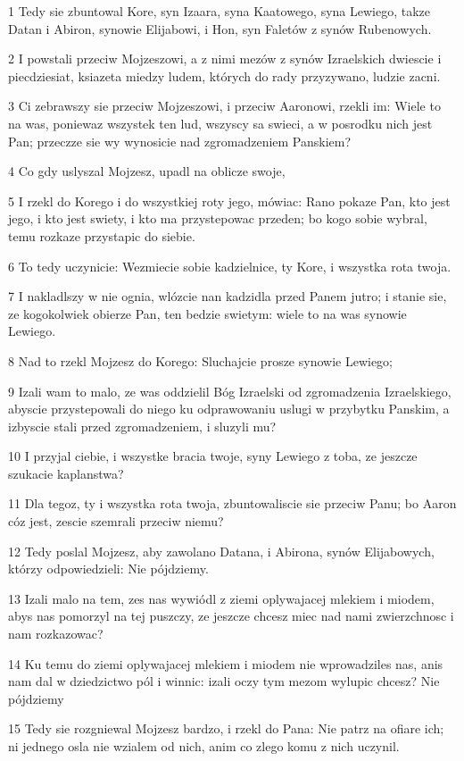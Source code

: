 \par 1 Tedy sie zbuntowal Kore, syn Izaara, syna Kaatowego, syna Lewiego, takze Datan i Abiron, synowie Elijabowi, i Hon, syn Faletów z synów Rubenowych.
\par 2 I powstali przeciw Mojzeszowi, a z nimi mezów z synów Izraelskich dwiescie i piecdziesiat, ksiazeta miedzy ludem, których do rady przyzywano, ludzie zacni.
\par 3 Ci zebrawszy sie przeciw Mojzeszowi, i przeciw Aaronowi, rzekli im: Wiele to na was, poniewaz wszystek ten lud, wszyscy sa swieci, a w posrodku nich jest Pan; przeczze sie wy wynosicie nad zgromadzeniem Panskiem?
\par 4 Co gdy uslyszal Mojzesz, upadl na oblicze swoje,
\par 5 I rzekl do Korego i do wszystkiej roty jego, mówiac: Rano pokaze Pan, kto jest jego, i kto jest swiety, i kto ma przystepowac przeden; bo kogo sobie wybral, temu rozkaze przystapic do siebie.
\par 6 To tedy uczynicie: Wezmiecie sobie kadzielnice, ty Kore, i wszystka rota twoja.
\par 7 I nakladlszy w nie ognia, wlózcie nan kadzidla przed Panem jutro; i stanie sie, ze kogokolwiek obierze Pan, ten bedzie swietym: wiele to na was synowie Lewiego.
\par 8 Nad to rzekl Mojzesz do Korego: Sluchajcie prosze synowie Lewiego;
\par 9 Izali wam to malo, ze was oddzielil Bóg Izraelski od zgromadzenia Izraelskiego, abyscie przystepowali do niego ku odprawowaniu uslugi w przybytku Panskim, a izbyscie stali przed zgromadzeniem, i sluzyli mu?
\par 10 I przyjal ciebie, i wszystke bracia twoje, syny Lewiego z toba, ze jeszcze szukacie kaplanstwa?
\par 11 Dla tegoz, ty i wszystka rota twoja, zbuntowaliscie sie przeciw Panu; bo Aaron cóz jest, zescie szemrali przeciw niemu?
\par 12 Tedy poslal Mojzesz, aby zawolano Datana, i Abirona, synów Elijabowych, którzy odpowiedzieli: Nie pójdziemy.
\par 13 Izali malo na tem, zes nas wywiódl z ziemi oplywajacej mlekiem i miodem, abys nas pomorzyl na tej puszczy, ze jeszcze chcesz miec nad nami zwierzchnosc i nam rozkazowac?
\par 14 Ku temu do ziemi oplywajacej mlekiem i miodem nie wprowadziles nas, anis nam dal w dziedzictwo pól i winnic: izali oczy tym mezom wylupic chcesz? Nie pójdziemy
\par 15 Tedy sie rozgniewal Mojzesz bardzo, i rzekl do Pana: Nie patrz na ofiare ich; ni jednego osla nie wzialem od nich, anim co zlego komu z nich uczynil.
